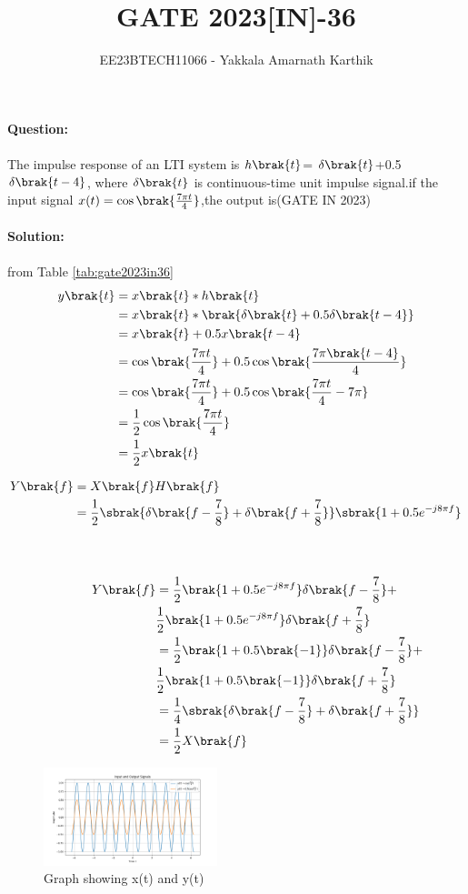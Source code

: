 \documentclass[journal,12pt,twocolumn]{IEEEtran}
\begin{document}


\title{GATE 2023[IN]-36}
\author{EE23BTECH11066 - Yakkala Amarnath Karthik}
\maketitle

\textbf{Question:}\\ \\
The impulse response of an LTI system is $h\brak{t}$= $\delta\brak{t}$+0.5$ \delta\brak{t-4}$, where $\delta\brak{t}$ is continuous-time unit impulse signal.if the input signal $x(t)=\cos\brak{\frac{7\pi t}{4}}$,the output is\hfill(GATE IN 2023)\\ \\

\textbf{Solution:}\\
\fi
    \\

 from Table \ref{tab:gate2023in36}
\begin{align}
    y\brak{t} &=x\brak{t} * h\brak{t}\\
            &=x\brak{t} * \brak{\delta\brak{t}+0.5 \delta\brak{t-4}}\\
            &=x\brak{t}+0.5x\brak{t-4}\\
            &=\cos\brak{\frac{7\pi t}{4}}+0.5\cos\brak{\frac{7\pi \brak{t-4}}{4}}\\
            &=\cos\brak{\frac{7\pi t}{4}}+0.5\cos\brak{\frac{7\pi t}{4}-7\pi}\\
            &=\frac{1}{2}\cos\brak{\frac{7\pi t}{4}}\\
            &=\frac{1}{2}x\brak{t}
\end{align}

\begin{align}
    Y\brak{f} &= X\brak{f}H\brak{f}\\
   &=\frac{1}{2}\sbrak{\delta \brak{f-\frac{7}{8}}+\delta \brak{f+\frac{7}{8}}}\sbrak{1+0.5e^{-j8\pi f}}
         \end{align} \\ \\
 \vspace{7.2cm}
\begin{align}
  \hspace{1.2cm}Y\brak{f} &=\frac{1}{2}\brak{1+0.5e^{-j8\pi f}}\delta \brak{f-\frac{7}{8}}+\nonumber\\
   &\frac{1}{2}\brak{1+0.5e^{-j8\pi f}}\delta \brak{f+\frac{7}{8}}\\
   &=\frac{1}{2}\brak{1+0.5\brak{-1}}\delta \brak{f-\frac{7}{8}}+\nonumber\\
   &\frac{1}{2}\brak{1+0.5\brak{-1}}\delta \brak{f+\frac{7}{8}}\\
  &=\frac{1}{4}\sbrak{\delta \brak{f-\frac{7}{8}}+\delta \brak{f+\frac{7}{8}}}\\
   &=\frac{1}{2}X\brak{f}
\end{align}

\begin{figure}[ht]
    \centering
    \includegraphics[width=0.45\textwidth]{2023/IN/36/figs/pythongate.png}
    \caption{Graph showing x(t) and y(t)}
\end{figure}
\end{document}
